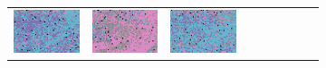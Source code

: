 \documentclass{ipol}
\begin{document}
\begin{figure}[ht]
\begin{subfigure}[t]{\linewidth}
\begin{tabular}{ccccccccc}
                \includegraphics[width=\s]{images/night/DCB/bid_j98_64_grids.png}&
                \includegraphics[width=\s]{images/night/DHT/bid_j98_64_grids.png}&
                \includegraphics[width=\s]{images/night/LINEAR/bid_j98_64_grids.png}&

\end{tabular}
\end{subfigure}
\end{figure}
\end{document}
